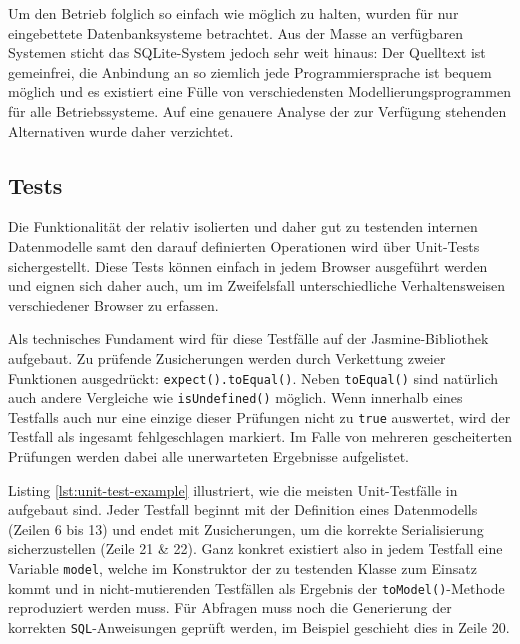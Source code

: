 Um den Betrieb folglich so einfach wie möglich zu halten, wurden für \idename{} nur eingebettete Datenbanksysteme betrachtet. Aus der Masse an verfügbaren Systemen sticht das SQLite-System jedoch sehr weit hinaus: Der Quelltext ist gemeinfrei, die Anbindung an so ziemlich jede Programmiersprache ist bequem möglich und es existiert eine Fülle von verschiedensten Modellierungsprogrammen für alle Betriebssysteme. Auf eine genauere Analyse der zur Verfügung stehenden Alternativen wurde daher verzichtet.

\subsection{Tests}
\label{sec:implementation-tests}

Die Funktionalität der relativ isolierten und daher gut zu testenden internen Datenmodelle samt den darauf definierten Operationen wird über Unit-Tests sichergestellt. Diese Tests können einfach in jedem Browser ausgeführt werden und eignen sich daher auch, um im Zweifelsfall unterschiedliche Verhaltensweisen verschiedener Browser zu erfassen.

Als technisches Fundament wird für diese Testfälle auf der Jasmine-Bibliothek aufgebaut. Zu prüfende Zusicherungen werden durch Verkettung zweier Funktionen ausgedrückt: \texttt{expect().toEqual()}. Neben \texttt{toEqual()} sind natürlich auch andere Vergleiche wie \texttt{isUndefined()} möglich. Wenn innerhalb eines Testfalls auch nur eine einzige dieser Prüfungen nicht zu \texttt{true} auswertet, wird der Testfall als ingesamt fehlgeschlagen markiert. Im Falle von mehreren gescheiterten Prüfungen werden dabei alle unerwarteten Ergebnisse aufgelistet.





Listing \ref{lst:unit-test-example} illustriert, wie die meisten Unit-Testfälle in \idename{} aufgebaut sind. Jeder Testfall beginnt mit der Definition eines Datenmodells (Zeilen 6 bis 13) und endet mit Zusicherungen, um die korrekte Serialisierung sicherzustellen (Zeile 21 \& 22). Ganz konkret existiert also in jedem Testfall eine Variable \texttt{model}, welche im Konstruktor der zu testenden Klasse zum Einsatz kommt und in nicht-mutierenden Testfällen als Ergebnis der \texttt{toModel()}-Methode reproduziert werden muss. Für Abfragen muss noch die Generierung der korrekten \texttt{SQL}-Anweisungen geprüft werden, im Beispiel geschieht dies in Zeile 20.


